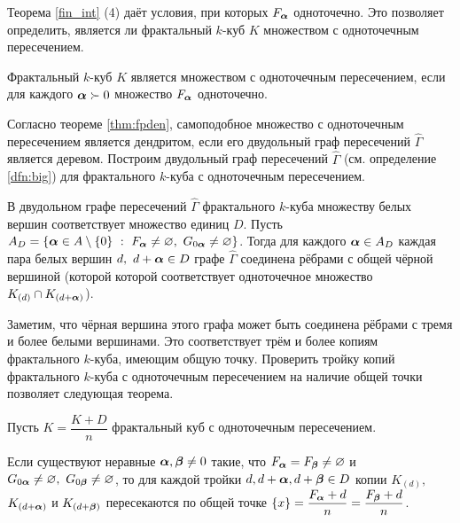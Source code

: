 Теорема \ref{fin_int} (4) даёт условия, при которых $F_{\bm{\alpha}}$ одноточечно.
Это позволяет определить, является ли фрактальный $k$-куб $K$ множеством с одноточечным пересечением. 

\begin{corollary}\label{SIPQ}
Фрактальный $k$-куб $K$ является множеством с одноточечным пересечением, если для каждого ${\bm{\alpha}}\succ0$ множество $F_{\bm{\alpha}}$ одноточечно.
\end{corollary}


Согласно теореме \ref{thm:fpden}, самоподобное множество с одноточечным пересечением является дендритом, если его двудольный граф пересечений $\hat\Gamma$ является деревом.
Построим двудольный граф пересечений $\hat\Gamma$ (см. определение \ref{dfn:big}) для фрактального $k$-куба с одноточечным пересечением.

В двудольном графе пересечений $\hat\Gamma$ фрактального $k$-куба множеству белых вершин соответствует множество единиц $D$.
Пусть $A_D=\{\bma\in A\mmm\{0\}\ :\ F_\bma\neq\0,\ G_{0\bma}\neq\0\}$.
Тогда для каждого ${\bm{\alpha}}\in A_D$ каждая пара белых вершин $d,\ d+{\bm{\alpha}}\in D$ графе $\hat\Gamma$ соединена рёбрами с общей чёрной вершиной (которой которой соответствует одноточечное множество $K_{(d)}\cap K_{(d+{\bm{\alpha}})}$).

Заметим, что чёрная вершина этого графа может быть соединена рёбрами с тремя и более белыми вершинами.
Это соответствует трём и более копиям фрактального $k$-куба, имеющим общую точку.
Проверить тройку копий фрактального $k$-куба с одноточечным пересечением на наличие общей точки позволяет следующая теорема.


\begin{theorem}\label{thm:triple}
Пусть $K=\dfrac{K+D}{n}$ фрактальный куб с одноточечным пересечением. 

Если существуют неравные ${\bm{\alpha}},{\bm{\beta}}\neq0$ такие, что $F_{\bm{\alpha}}=F_{\bm{\beta}}\neq\varnothing$ и $G_{0{\bm{\alpha}}}\neq\varnothing,\ G_{0{\bm{\beta}}}\neq\varnothing$,  то для каждой тройки $d, d+{\bm{\alpha}}, d+{\bm{\beta}}\in D$ копии $K_{(d)},$ $K_{(d+{\bm{\alpha}})}$ и $K_{(d+{\bm{\beta}})}$ пересекаются по общей точке $\{x\}=\dfrac{F_{\bm{\alpha}}+d}{n}=\dfrac{F_{\bm{\beta}}+d}{n}$.
\end{theorem}

